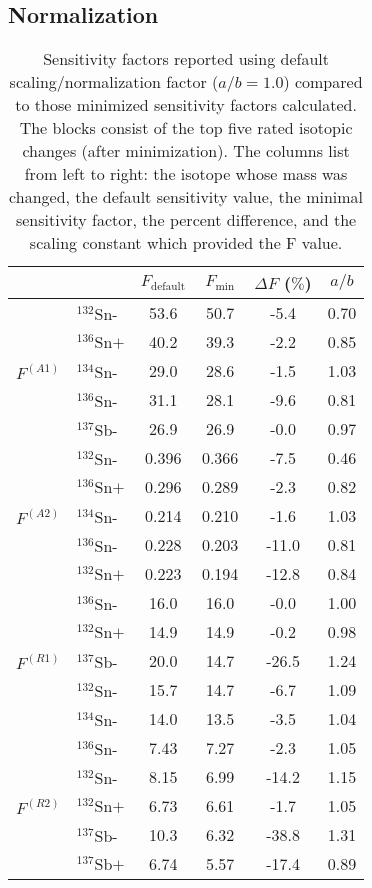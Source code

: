 \documentclass[aps,prc,reprint,showpacs,floatfix,nofootinbib]{revtex4-1}
\begin{document}
\subsection{Normalization}
\label{sec:normalization-calibration}
\begin{table}
\begin{tabular}{llcccc}
  & & $F_\textrm{default}$ & $F_\textrm{min}$ &  $\Delta F $ ($\%$) & $a/b$ \\ \hline \hline
\multirow{5}{*}{$F^{(A1)}$} & $^{132}\textrm{Sn} \texttt{-}$ & 53.6 & 50.7 &  -5.4 & 0.70 \\
 & $^{136}\textrm{Sn} \texttt{+}$ & 40.2 & 39.3 &  -2.2 & 0.85 \\
 & $^{134}\textrm{Sn} \texttt{-}$ & 29.0 & 28.6 & -1.5 & 1.03 \\
 & $^{136}\textrm{Sn} \texttt{-}$ & 31.1 & 28.1 &  -9.6 & 0.81 \\
 & $^{137}\textrm{Sb} \texttt{-}$ & 26.9 & 26.9 &  -0.0 & 0.97 \\ \hline
\multirow{5}{*}{$F^{(A2)}$} & $^{132}\textrm{Sn} \texttt{-}$ & 0.396 & 0.366 &  -7.5 & 0.46 \\
 & $^{136}\textrm{Sn} \texttt{+}$ & 0.296 & 0.289 &  -2.3 & 0.82 \\
 & $^{134}\textrm{Sn} \texttt{-}$ & 0.214 & 0.210 &  -1.6 & 1.03 \\
 & $^{136}\textrm{Sn} \texttt{-}$ & 0.228 & 0.203 &  -11.0 & 0.81 \\
 & $^{132}\textrm{Sn} \texttt{+}$ & 0.223 & 0.194 &  -12.8 & 0.84 \\ \hline 
\multirow{5}{*}{$F^{(R1)}$} & $^{136}\textrm{Sn} \texttt{-}$ & 16.0 & 16.0 &  -0.0 & 1.00 \\
 & $^{132}\textrm{Sn} \texttt{+}$ & 14.9 & 14.9 &  -0.2 & 0.98 \\
 & $^{137}\textrm{Sb} \texttt{-}$ & 20.0 & 14.7 &  -26.5 & 1.24 \\
 & $^{132}\textrm{Sn} \texttt{-}$ & 15.7 & 14.7 &  -6.7 & 1.09 \\
 & $^{134}\textrm{Sn} \texttt{-}$ & 14.0 & 13.5 &  -3.5 & 1.04 \\ \hline 
\multirow{5}{*}{$F^{(R2)}$} & $^{136}\textrm{Sn} \texttt{-}$ & 7.43 & 7.27 &  -2.3 & 1.05 \\
 & $^{132}\textrm{Sn} \texttt{-}$ & 8.15 & 6.99 &  -14.2 & 1.15 \\
 & $^{132}\textrm{Sn} \texttt{+}$ & 6.73 & 6.61 &  -1.7 & 1.05 \\
 & $^{137}\textrm{Sb} \texttt{-}$ & 10.3 & 6.32 &  -38.8 & 1.31 \\
 & $^{137}\textrm{Sb} \texttt{+}$ & 6.74 & 5.57 &  -17.4 & 0.89 \\
\end{tabular}
\caption{Sensitivity factors reported using default scaling/normalization factor ($a/b = 1.0$) compared to those 
minimized sensitivity factors calculated. The blocks consist of the top five rated isotopic changes (after minimization). 
The columns list 
from left to right: the isotope whose mass was changed, the default sensitivity value, the minimal sensitivity factor, 
the percent difference, and the scaling constant which 
provided the F value. \label{table:changesFromNormalization}}
\end{table}
\end{document}
